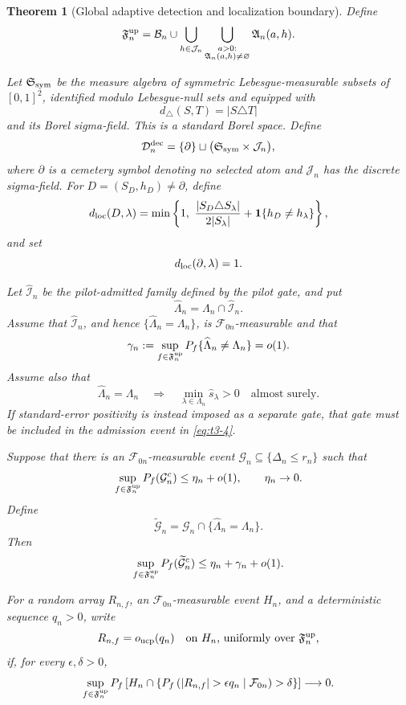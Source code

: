 \documentclass[11pt]{article}
\newtheorem{theorem}{Theorem}[section]
\theoremstyle{definition}
\newcommand{\1}{\mathbf 1}\newcommand{\op}{\operatorname}
\begin{document}
\begin{theorem}[Global adaptive detection and localization boundary]
Define
\[
\mathfrak F_n^{\rm up}
=
\mathcal B_n
\cup
\bigcup_{h\in\mathcal J_n}
\bigcup_{\substack{a>0:\\
                   \mathfrak A_n(a,h)\ne\varnothing}}
\mathfrak A_n(a,h).
\]

Let \(\mathfrak S_{\rm sym}\) be the measure algebra of symmetric
Lebesgue-measurable subsets of \([0,1]^2\), identified modulo
Lebesgue-null sets and equipped with
\[
d_\triangle(S,T)=|S\triangle T|
\]
and its Borel sigma-field.  This is a standard Borel space.  Define
\[
\mathcal D_n^{\rm dec}
=
\{\partial\}
\sqcup
\bigl(\mathfrak S_{\rm sym}\times\mathcal J_n\bigr),
\]
where \(\partial\) is a cemetery symbol denoting no selected atom and
\(\mathcal J_n\) has the discrete sigma-field.  For
\(D=(S_D,h_D)\ne\partial\), define
\[
d_{\rm loc}(D,\lambda)
=
\min\left\{
1,\
\frac{|S_D\triangle S_\lambda|}{2|S_\lambda|}
+
\mathbf 1\{h_D\ne h_\lambda\}
\right\},
\]
and set
\[
d_{\rm loc}(\partial,\lambda)=1.
\]

Let \(\widehat{\mathcal I}_n\) be the pilot-admitted family defined
by the pilot gate, and put
\[
\widehat\Lambda_n
=
\Lambda_n\cap\widehat{\mathcal I}_n.
\]
Assume that \(\widehat{\mathcal I}_n\), and hence
\(\{\widehat\Lambda_n=\Lambda_n\}\), is
\(\mathcal F_{0n}\)-measurable and that
\begin{equation}
\gamma_n
:=
\sup_{f\in\mathfrak F_n^{\rm up}}
P_f\{\widehat\Lambda_n\ne\Lambda_n\}
=o(1).
\label{eq:t3-4}
\end{equation}
Assume also that
\[
\widehat\Lambda_n=\Lambda_n
\quad\Longrightarrow\quad
\min_{\lambda\in\Lambda_n}\widehat s_\lambda>0
\quad\text{almost surely}.
\]
If standard-error positivity is instead imposed as a separate gate,
that gate must be included in the admission event in
\eqref{eq:t3-4}.

Suppose that there is an \(\mathcal F_{0n}\)-measurable event
\(\mathcal G_n\subseteq\{\Delta_n\le r_n\}\) such that
\begin{equation}
\sup_{f\in\mathfrak F_n^{\rm up}}
P_f(\mathcal G_n^c)
\le\eta_n+o(1),
\qquad
\eta_n\to0.
\label{eq:t3-5}
\end{equation}
Define
\[
\widetilde{\mathcal G}_n
=
\mathcal G_n
\cap
\{\widehat\Lambda_n=\Lambda_n\}.
\]
Then
\begin{equation}
\sup_{f\in\mathfrak F_n^{\rm up}}
P_f(\widetilde{\mathcal G}_n^c)
\le
\eta_n+\gamma_n+o(1).
\label{eq:t3-6}
\end{equation}

For a random array \(R_{n,f}\), an
\(\mathcal F_{0n}\)-measurable event \(H_n\), and a deterministic
sequence \(q_n>0\), write
\[
R_{n,f}=o_{\rm ucp}(q_n)
\quad
\text{on \(H_n\), uniformly over \(\mathfrak F_n^{\rm up}\),}
\]
if, for every \(\epsilon,\delta>0\),
\[
\sup_{f\in\mathfrak F_n^{\rm up}}
P_f\left[
H_n
\cap
\left\{
P_f\left(
|R_{n,f}|>\epsilon q_n
\mid\mathcal F_{0n}
\right)>\delta
\right\}
\right]
\longrightarrow0.
\]


\end{theorem}
\end{document}
